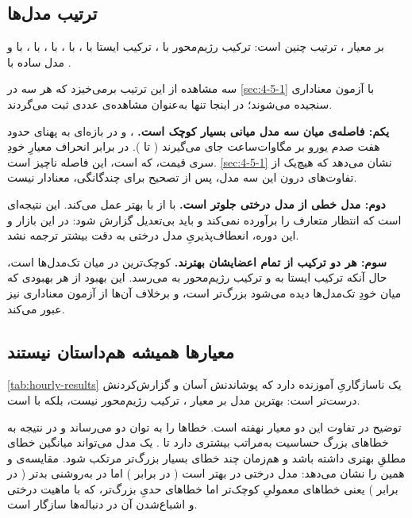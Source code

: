 \subsection*{ترتیب مدل‌ها}

بر معیار ، ترتیب چنین است: ترکیب رژیم‌محور با ، ترکیب ایستا با
،  با ،  با ،
 با ،  با  و مدل ساده با
.

سه مشاهده از این ترتیب برمی‌خیزد که هر سه در \cref{sec:4-5-1} با آزمون معناداری سنجیده
می‌شوند؛ در اینجا تنها به‌عنوان مشاهده‌ی عددی ثبت می‌گردند.

\textbf{یکم: فاصله‌ی میان سه مدل میانی بسیار کوچک است.} ،  و
 در بازه‌ای به پهنای حدود هفت صدم یورو بر مگاوات‌ساعت جای می‌گیرند
( تا ). در برابر انحراف معیارِ خودِ سری قیمت، که 
است، این فاصله ناچیز است. \cref{sec:4-5-1} نشان می‌دهد که هیچ‌یک از تفاوت‌های درون این سه
مدل، پس از تصحیح برای چندگانگی، معنادار نیست.

\textbf{دوم: مدل خطی از مدل درختی جلوتر است.}  با  از
 با  بهتر عمل می‌کند. این نتیجه‌ای است که انتظار متعارف را
برآورده نمی‌کند و باید بی‌تعدیل گزارش شود: در این بازار و این دوره، انعطاف‌پذیریِ
مدل درختی به دقت بیشتر ترجمه نشد.

\textbf{سوم: هر دو ترکیب از تمام اعضایشان بهترند.} کوچک‌ترین  در میان
تک‌مدل‌ها  است، حال آنکه ترکیب ایستا به  و ترکیب رژیم‌محور به
 می‌رسد. این بهبود از هر بهبودی که میان خودِ تک‌مدل‌ها دیده می‌شود بزرگ‌تر
است، و برخلاف آن‌ها از آزمون معناداری نیز عبور می‌کند.

\subsection*{معیارها همیشه هم‌داستان نیستند}

\cref{tab:hourly-results} یک ناسازگاریِ آموزنده دارد که پوشاندنش آسان و
گزارش‌کردنش درست‌تر است: بهترین مدل بر معیار ، ترکیب رژیم‌محور نیست، بلکه
 با  است.

توضیح در تفاوت این دو معیار نهفته است.  خطاها را به توان دو می‌رساند و در
نتیجه به خطاهای بزرگ حساسیت به‌مراتب بیشتری دارد تا . یک مدل می‌تواند
میانگین خطای مطلقِ بهتری داشته باشد و هم‌زمان چند خطای بسیار بزرگ‌تر مرتکب شود.
مقایسه‌ی  و  همین را نشان می‌دهد: مدل درختی در 
بهتر است ( در برابر ) اما در  به‌روشنی بدتر
( در برابر )  یعنی خطاهای معمولیِ کوچک‌تر اما خطاهای
حدیِ بزرگ‌تر، که با ماهیت درختی و اشباع‌شدن آن در دنباله‌ها سازگار است.

